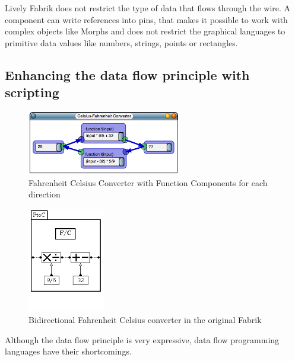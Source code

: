 \documentclass[pdftex, times, 10pt, twocolumn]{article}
\begin{document}
Lively Fabrik does not restrict the type of data that flows through the wire. A component can write references into pins, that makes it possible to work with complex objects like Morphs and does not restrict the graphical languages to primitive data values like numbers, strings, points or rectangles.  



\subsection{Enhancing the data flow principle with scripting}


\begin{figure}[]\centering
\includegraphics[width=0.600000\textwidth]{FabrikCelsiusFahrenheit.png} 

\caption{Fahrenheit Celsius Converter with Function Components for each direction }
\label{fig:FabrikCelsiusFahrenheit}
\end{figure}


\begin{figure}[]\centering
\includegraphics[width=0.300000\textwidth]{Fabrik_figure2b.png} 

\caption{Bidirectional Fahrenheit Celsius converter in the original Fabrik }
\label{fig:FabrikCelsiusFahrenheitOriginal}
\end{figure}
Although the data flow principle is very expressive, data flow programming languages have their shortcomings. 
\end{document}

